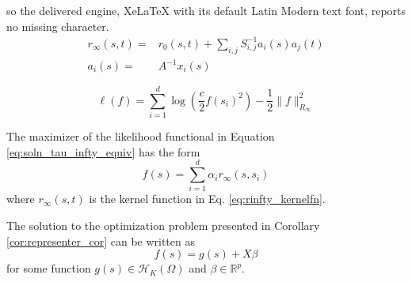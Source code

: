 \documentclass[10pt,a4paper]{amsart}
\begin{document}
so the delivered engine, XeLaTeX with its default Latin Modern text font, reports no missing character.
\begin{equation}
    \label{eq:rinfty_kernelfn}
    \begin{split}
        r_\infty(s,t) =& r_0(s,t)+\sum_{i,j}S^{-1}_{i,j}a_i(s)a_j(t)\\
        a_i(s) =& A^{-1}x_i(s) 
    \end{split}
\end{equation}

\begin{equation}\label{eq:soln_tau_infty_equiv}
    \ell(f) = \sum_{i=1}^d\log\left(\frac{c}{2}f(s_i)^2\right)-\frac{1}{2}\|f\|_{R_\infty}^2
\end{equation}

\begin{corollary}\label{cor:representer_cor}
    The maximizer of the likelihood functional in Equation \eqref{eq:soln_tau_infty_equiv} has the form 
    \begin{equation}\label{eq:repthm_minimizer}
    f(s)=\sum_{i=1}^d\alpha_ir_\infty(s,s_i)
    \end{equation}
    where $r_\infty(s,t)$ is the kernel function in Eq. \eqref{eq:rinfty_kernelfn}.
\end{corollary}

\begin{prop}
    The solution to the optimization problem presented in Corollary \ref{cor:representer_cor} can be written as
    \begin{equation}
        f(s) = g(s)+X\beta
    \end{equation}
    for some function $g(s)\in \mathcal{H}_K(\Omega)$ and $\beta\in \mathbb{R}^p$.
\end{prop}
\end{document}
